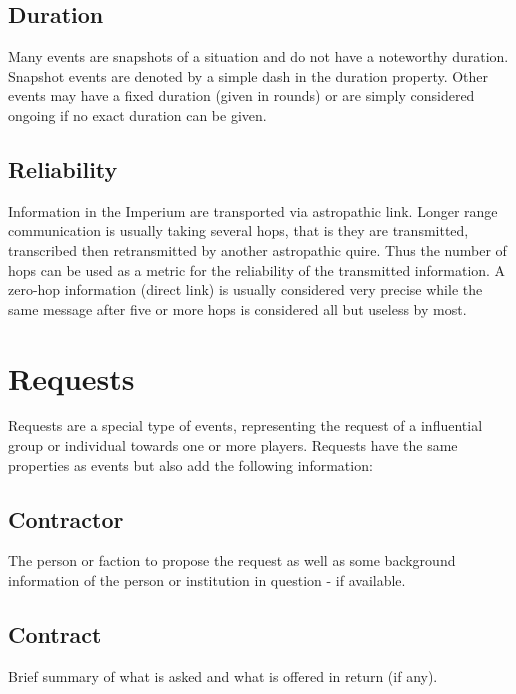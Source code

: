 \subsection{Duration}
Many events are snapshots of a situation and do not have a noteworthy duration. Snapshot events are denoted by a simple dash in the duration property. Other events may have a fixed duration (given in rounds) or are simply considered ongoing if no exact duration can be given.

\subsection{Reliability}
Information in the Imperium are transported via astropathic link. Longer range communication is usually taking several hops, that is they are transmitted, transcribed then retransmitted  by another astropathic quire. Thus the number of hops can be used as a metric for the reliability of the transmitted information. A zero-hop information (direct link) is usually considered very precise while the same message after five or more hops is considered all but useless by most.

\section{Requests}
Requests are a special type of events, representing the request of a influential group or individual towards one or more players. Requests have the same properties as events but also add the following information:

\subsection{Contractor}
The person or faction to propose the request as well as some background information of the person or institution in question - if available.

\subsection{Contract}
Brief summary of what is asked and what is offered in return (if any).


